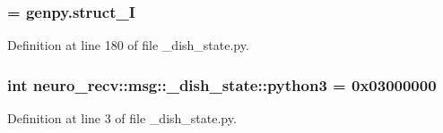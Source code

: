 \subsubsection[{\-\_\-struct\-\_\-\-I}]{ = genpy.\-struct\-\_\-\-I}\label{namespaceneuro__recv_1_1msg_1_1__dish__state_a6cf5cd7b290c57b75e94b0c6acb1b5fd}


\-Definition at line 180 of file \-\_\-dish\-\_\-state.\-py.

\subsubsection[{python3}]{\setlength{\rightskip}{0pt plus 5cm}int {\bf neuro\-\_\-recv\-::msg\-::\-\_\-dish\-\_\-state\-::python3} = 0x03000000}\label{namespaceneuro__recv_1_1msg_1_1__dish__state_a460c28fe43c985778e7120086e47ebf6}


\-Definition at line 3 of file \-\_\-dish\-\_\-state.\-py.

